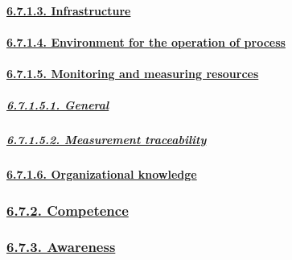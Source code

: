 \documentclass[
]{article}
\begin{document}
\hypertarget{infrastructure}{%
\paragraph{\texorpdfstring{\protect\hyperlink{infrastructure-1}{6.7.1.3.
Infrastructure}}{6.7.1.3. Infrastructure}}\label{infrastructure}}

\hypertarget{environment-for-the-operation-of-process}{%
\paragraph{\texorpdfstring{\protect\hyperlink{environment-for-the-operation-of-process-1}{6.7.1.4.
Environment for the operation of
process}}{6.7.1.4. Environment for the operation of process}}\label{environment-for-the-operation-of-process}}

\hypertarget{monitoring-and-measuring-resources}{%
\paragraph{\texorpdfstring{\protect\hyperlink{monitoring-and-measuring-resources-1}{6.7.1.5.
Monitoring and measuring
resources}}{6.7.1.5. Monitoring and measuring resources}}\label{monitoring-and-measuring-resources}}

\hypertarget{general-2}{%
\subparagraph{\texorpdfstring{\protect\hyperlink{general-11}{6.7.1.5.1.
General}}{6.7.1.5.1. General}}\label{general-2}}

\hypertarget{measurement-traceability}{%
\subparagraph{\texorpdfstring{\protect\hyperlink{measurement-traceability-1}{6.7.1.5.2.
Measurement
traceability}}{6.7.1.5.2. Measurement traceability}}\label{measurement-traceability}}

\hypertarget{organizational-knowledge}{%
\paragraph{\texorpdfstring{\protect\hyperlink{organizational-knowledge-1}{6.7.1.6.
Organizational
knowledge}}{6.7.1.6. Organizational knowledge}}\label{organizational-knowledge}}

\hypertarget{competence}{%
\subsubsection{\texorpdfstring{\protect\hyperlink{competence-1}{6.7.2.
Competence}}{6.7.2. Competence}}\label{competence}}

\hypertarget{awareness}{%
\subsubsection{\texorpdfstring{\protect\hyperlink{awareness-1}{6.7.3.
Awareness}}{6.7.3. Awareness}}\label{awareness}}
\end{document}
